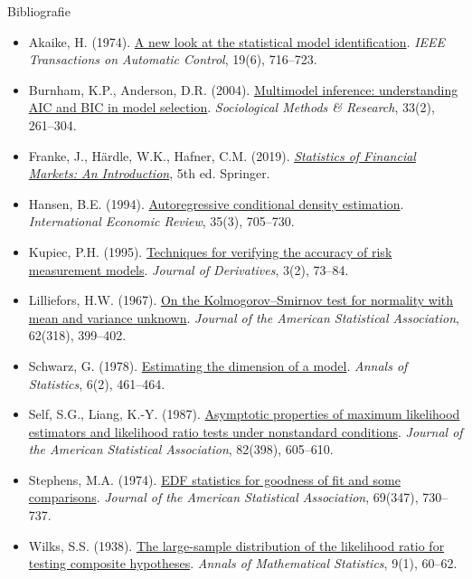 \begin{frame}{Bibliografie}
\itemsize{\tiny}
\begin{itemize}
    \item Akaike, H. (1974). \href{https://doi.org/10.1109/TAC.1974.1100705}{A new look at the statistical model identification}. \textit{IEEE Transactions on Automatic Control}, 19(6), 716--723.
    \item Burnham, K.P., Anderson, D.R. (2004). \href{https://doi.org/10.1177/0049124104268644}{Multimodel inference: understanding AIC and BIC in model selection}. \textit{Sociological Methods \& Research}, 33(2), 261--304.
    \item Franke, J., Härdle, W.K., Hafner, C.M. (2019). \href{https://doi.org/10.1007/978-3-030-13751-9}{\textit{Statistics of Financial Markets: An Introduction}}, 5th ed. Springer.
    \item Hansen, B.E. (1994). \href{https://doi.org/10.2307/2527081}{Autoregressive conditional density estimation}. \textit{International Economic Review}, 35(3), 705--730.
    \item Kupiec, P.H. (1995). \href{https://doi.org/10.3905/jod.1995.407942}{Techniques for verifying the accuracy of risk measurement models}. \textit{Journal of Derivatives}, 3(2), 73--84.
    \item Lilliefors, H.W. (1967). \href{https://doi.org/10.1080/01621459.1967.10482916}{On the Kolmogorov--Smirnov test for normality with mean and variance unknown}. \textit{Journal of the American Statistical Association}, 62(318), 399--402.
    \item Schwarz, G. (1978). \href{https://doi.org/10.1214/aos/1176344136}{Estimating the dimension of a model}. \textit{Annals of Statistics}, 6(2), 461--464.
    \item Self, S.G., Liang, K.-Y. (1987). \href{https://doi.org/10.1080/01621459.1987.10478472}{Asymptotic properties of maximum likelihood estimators and likelihood ratio tests under nonstandard conditions}. \textit{Journal of the American Statistical Association}, 82(398), 605--610.
    \item Stephens, M.A. (1974). \href{https://doi.org/10.1080/01621459.1974.10480196}{EDF statistics for goodness of fit and some comparisons}. \textit{Journal of the American Statistical Association}, 69(347), 730--737.
    \item Wilks, S.S. (1938). \href{https://doi.org/10.1214/aoms/1177732360}{The large-sample distribution of the likelihood ratio for testing composite hypotheses}. \textit{Annals of Mathematical Statistics}, 9(1), 60--62.
\end{itemize}
\end{frame}


